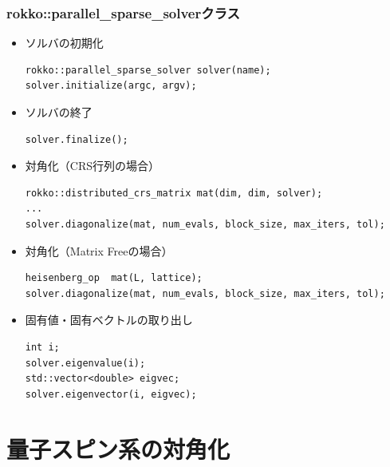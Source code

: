 \begin{frame}[c,fragile]
  \frametitle{rokko::parallel\_sparse\_solverクラス}
\vspace{-1\baselineskip}
  \begin{itemize}
  \item ソルバの初期化
\begin{lstlisting}
rokko::parallel_sparse_solver solver(name);
solver.initialize(argc, argv);
\end{lstlisting}
  \item ソルバの終了
\begin{lstlisting}
solver.finalize();
\end{lstlisting}
  \item 対角化（CRS行列の場合）
\begin{lstlisting}
rokko::distributed_crs_matrix mat(dim, dim, solver);
...
solver.diagonalize(mat, num_evals, block_size, max_iters, tol);
\end{lstlisting}
  \item 対角化（Matrix Freeの場合）
\begin{lstlisting}
heisenberg_op  mat(L, lattice);
solver.diagonalize(mat, num_evals, block_size, max_iters, tol);
\end{lstlisting}
  \item 固有値・固有ベクトルの取り出し
\begin{lstlisting}
int i;
solver.eigenvalue(i);
std::vector<double> eigvec;
solver.eigenvector(i, eigvec);
\end{lstlisting}
  \end{itemize}
\end{frame}



\section{量子スピン系の対角化}

